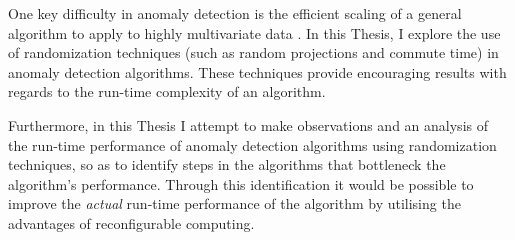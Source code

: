 One key difficulty in anomaly detection is the efficient scaling of a general
algorithm to apply to highly multivariate data \citeNeeded. In this Thesis, I
explore the use of randomization techniques (such as random projections and 
commute time) in anomaly detection algorithms. These techniques provide
encouraging results with regards to the run-time complexity of an algorithm.

Furthermore, in this Thesis I attempt to make observations and an analysis of
the run-time performance of anomaly detection algorithms using randomization
techniques, so as to identify steps in the algorithms that bottleneck the
algorithm's performance. Through this identification it would be possible to
improve the \emph{actual} run-time performance of the algorithm by utilising the
advantages of reconfigurable computing.

